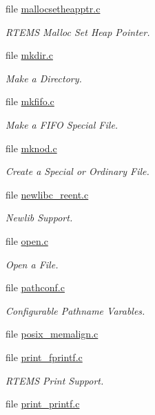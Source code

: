 \begin{DoxyCompactItemize}
file \mbox{\hyperlink{mallocsetheapptr_8c}{mallocsetheapptr.\+c}}
\begin{DoxyCompactList}\small\item\em R\+T\+E\+MS Malloc Set Heap Pointer. \end{DoxyCompactList}\item 
file \mbox{\hyperlink{mkdir_8c}{mkdir.\+c}}
\begin{DoxyCompactList}\small\item\em Make a Directory. \end{DoxyCompactList}\item 
file \mbox{\hyperlink{mkfifo_8c}{mkfifo.\+c}}
\begin{DoxyCompactList}\small\item\em Make a F\+I\+FO Special File. \end{DoxyCompactList}\item 
file \mbox{\hyperlink{mknod_8c}{mknod.\+c}}
\begin{DoxyCompactList}\small\item\em Create a Special or Ordinary File. \end{DoxyCompactList}\item 
file \mbox{\hyperlink{newlibc__reent_8c}{newlibc\+\_\+reent.\+c}}
\begin{DoxyCompactList}\small\item\em Newlib Support. \end{DoxyCompactList}\item 
file \mbox{\hyperlink{open_8c}{open.\+c}}
\begin{DoxyCompactList}\small\item\em Open a File. \end{DoxyCompactList}\item 
file \mbox{\hyperlink{pathconf_8c}{pathconf.\+c}}
\begin{DoxyCompactList}\small\item\em Configurable Pathname Varables. \end{DoxyCompactList}\item 
file \mbox{\hyperlink{posix__memalign_8c}{posix\+\_\+memalign.\+c}}
\item 
file \mbox{\hyperlink{print__fprintf_8c}{print\+\_\+fprintf.\+c}}
\begin{DoxyCompactList}\small\item\em R\+T\+E\+MS Print Support. \end{DoxyCompactList}\item 
file \mbox{\hyperlink{print__printf_8c}{print\+\_\+printf.\+c}}

\end{DoxyCompactItemize}
